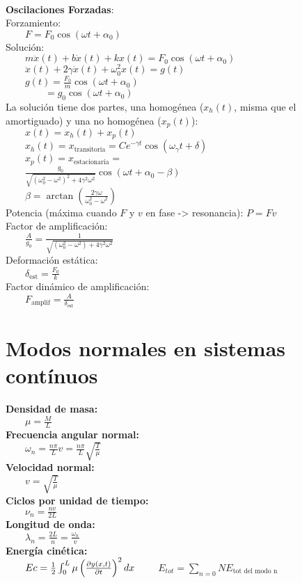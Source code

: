 \documentclass[a4paper,landscape,10pt]{cheatsheet}
\begin{document}
\hfill\\
\textbf{Oscilaciones Forzadas}:\\
Forzamiento: \\
$\qquad F=F_0\cos\left(\omega t+\alpha_0\right)$\\
Solución:\\
$\qquad m\ddot{x}(t)+b\dot{x}(t)+kx(t) = F_0\cos\left(\omega t+\alpha_0\right)$\\
$\qquad\ddot{x}(t)+2\gamma\dot{x}(t)+\omega_0^2x(t)=g(t)$\\
$\qquad g(t)=\frac{F_0}{m}\cos\left(\omega t+\alpha_0\right)$\\
$\qquad\qquad=g_0\cos\left(\omega t+\alpha_0\right)$\\

La solución tiene dos partes, una homogénea ($x_h(t)$, misma que el amortiguado) y una no homogénea ($x_p(t)$):\\
$\qquad x(t)=x_h(t)+x_p(t)$\\
$\qquad x_h(t)=x_\text{transitoria}=Ce^{-\gamma t}\cos\left(\omega_\gamma t+\delta\right)$\\
$\qquad x_p(t)=x_\text{estacionaria}=$\\
$\qquad \frac{g_0}{\sqrt{\left(\omega_0^2-\omega^2\right)^2+4\gamma^2\omega^2}}\cos\left(\omega t+\alpha_0-\beta\right)$\\
$\qquad \beta=\arctan\left(\frac{2\gamma\omega}{\omega_0^2-\omega^2}\right)$\\
Potencia (máxima cuando $F$ y $v$ en fase -> resonancia): $P=Fv$\\
Factor de amplificación: \\
$\qquad\frac{A}{g_0}=\frac{1}{\sqrt{\left(\omega_0^2-\omega^2\right)+4\gamma^2\omega^2}}$\\
Deformación estática: \\
$\qquad \delta_\text{est}=\frac{F_0}{k}$\\
Factor dinámico de amplificación: \\
$\qquad F_\text{amplif}=\frac{A}{\delta_\text{est}}$\\

\section{Modos normales en sistemas contínuos}
\textbf{Densidad de masa:} \\
$\qquad \mu=\frac{M}{L}$\\
\textbf{Frecuencia angular normal:}\\
$\qquad\omega_n=\frac{n\pi}{L}v=\frac{n\pi}{L}\sqrt{\frac{T}{\mu}}$\\
\textbf{Velocidad normal:} \\
$\qquad v=\sqrt{\frac{T}{\mu}}$\\
\textbf{Ciclos por unidad de tiempo:} \\
$\qquad \nu_n=\frac{nv}{2L}$\\
\textbf{Longitud de onda:} \\
$\qquad \lambda_n=\frac{2L}{n}=\frac{\omega_n}{v}$\\
\textbf{Energía cinética:}\\
$\qquad Ec=\frac{1}{2}\int_0^L{\mu\left(\pdv{y(x,t)}{t}\right)^2dx}$
$\qquad E_{tot}=\sum_{n=0}{N}E_{\text{tot del modo n}}$
\end{document}
